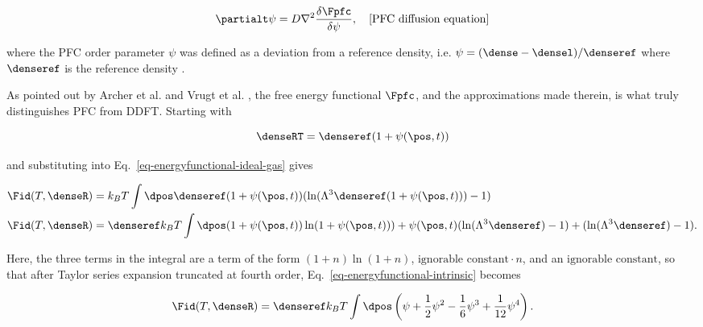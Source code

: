 \begin{align}
\partialt \psi = D \nabla^2 \frac{\delta \Fpfc}{\delta \psi}, \quad \text{[PFC diffusion equation]}
\label{eq-pfc-diffusion}
\end{align}

where the PFC order parameter $\psi$ was defined as a deviation from a reference density, i.e. $\psi = (\dense - \densel)/\denseref$ where $\denseref$ is the reference density \cite{elder2001sharp}.

As pointed out by Archer et al. \cite{archer2012} and Vrugt et al. \cite{te2020classical}, the free energy functional $\Fpfc$, and the approximations made therein, is what truly distinguishes PFC from DDFT.  Starting with

\begin{equation}
\denseRT = \denseref(1 + \psi(\pos, t))
\end{equation}

and substituting into Eq.~\ref{eq-energyfunctional-ideal-gas} gives

\begin{subequations}
\begin{align}
\Fid(T, \denseR) &= k_B T \int \dpos \denseref(1 + \psi(\pos, t)) (\ln(\Lambda^3 \denseref(1 + \psi(\pos, t))) - 1) \\
\Fid(T, \denseR) &= \denseref k_B T \int \dpos (1 + \psi(\pos, t)) \ln(1 + \psi(\pos, t))) + \psi(\pos, t) (\ln(\Lambda^3 \denseref) - 1) + (\ln(\Lambda^3 \denseref) - 1).
\end{align}    
\end{subequations}

Here, the three terms in the integral are a term of the form $(1+n)\ln(1+n)$, $\text{ignorable constant} \cdot n$, and an $\text{ignorable constant}$, so that after Taylor series expansion truncated at fourth order, Eq.~\ref{eq-energyfunctional-intrinsic} becomes

\begin{equation}
\Fid(T, \denseR) = \denseref k_B T \int \dpos \left( \psi + \frac{1}{2} \psi^2 - \frac{1}{6} \psi^3 + \frac{1}{12} \psi^4 \right).
\end{equation}

